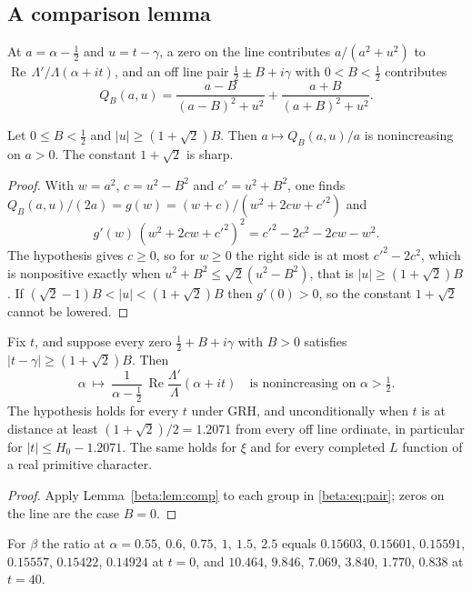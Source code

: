 \subsection{A comparison lemma}

At $a=\alpha-\tfrac12$ and $u=t-\gamma$, a zero on the line contributes $a/(a^2+u^2)$ to $\operatorname{Re}\,\Lambda'/\Lambda(\alpha+it)$, and an off line pair $\tfrac12\pm B+i\gamma$ with $0<B<\tfrac12$ contributes
\[
Q_B(a,u)=\frac{a-B}{(a-B)^2+u^2}+\frac{a+B}{(a+B)^2+u^2}.
\]

\begin{lemma}[Comparison]\label{beta:lem:comp}
Let $0\le B<\tfrac12$ and $|u|\ge(1+\sqrt2)B$. Then $a\mapsto Q_B(a,u)/a$ is nonincreasing on $a>0$. The constant $1+\sqrt2$ is sharp.
\end{lemma}

\begin{proof}
With $w=a^2$, $c=u^2-B^2$ and $c'=u^2+B^2$, one finds $Q_B(a,u)/(2a)=g(w)=(w+c)/(w^2+2cw+c'^2)$ and
\[
g'(w)\,(w^2+2cw+c'^2)^2=c'^2-2c^2-2cw-w^2.
\]
The hypothesis gives $c\ge0$, so for $w\ge0$ the right side is at most $c'^2-2c^2$, which is nonpositive exactly when $u^2+B^2\le\sqrt2(u^2-B^2)$, that is $|u|\ge(1+\sqrt2)B$. If $(\sqrt2-1)B<|u|<(1+\sqrt2)B$ then $g'(0)>0$, so the constant $1+\sqrt2$ cannot be lowered.
\end{proof}

\begin{theorem}\label{beta:thm:comp}
Fix $t$, and suppose every zero $\tfrac12+B+i\gamma$ with $B>0$ satisfies $|t-\gamma|\ge(1+\sqrt2)B$. Then
\[
\alpha\ \mapsto\ \frac{1}{\alpha-\frac12}\,\operatorname{Re}\frac{\Lambda'}{\Lambda}(\alpha+it)\quad\text{is nonincreasing on }\alpha>\tfrac12 .
\]
The hypothesis holds for every $t$ under GRH, and unconditionally when $t$ is at distance at least $(1+\sqrt2)/2=1.2071$ from every off line ordinate, in particular for $|t|\le H_0-1.2071$. The same holds for $\xi$ and for every completed $L$ function of a real primitive character.
\end{theorem}

\begin{proof}
Apply Lemma~\ref{beta:lem:comp} to each group in \eqref{beta:eq:pair}; zeros on the line are the case $B=0$.
\end{proof}

For $\beta$ the ratio at $\alpha=0.55,\ 0.6,\ 0.75,\ 1,\ 1.5,\ 2.5$ equals $0.15603$, $0.15601$, $0.15591$, $0.15557$, $0.15422$, $0.14924$ at $t=0$, and $10.464$, $9.846$, $7.069$, $3.840$, $1.770$, $0.838$ at $t=40$.

